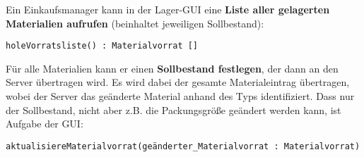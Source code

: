 Ein Einkaufsmanager kann in der Lager-GUI eine \textbf{Liste aller gelagerten Materialien aufrufen} (beinhaltet jeweiligen Sollbestand):

\texttt{holeVorratsliste() : Materialvorrat []}

Für alle Materialien kann er einen \textbf{Sollbestand festlegen}, der dann an den Server übertragen wird. Es wird dabei der gesamte Materialeintrag übertragen, wobei der Server das geänderte Material anhand des Typs identifiziert. Dass nur der Sollbestand, nicht aber z.B. die Packungsgröße geändert werden kann, ist Aufgabe der GUI:

\texttt{aktualisiereMaterialvorrat(geänderter\_Materialvorrat : Materialvorrat)}